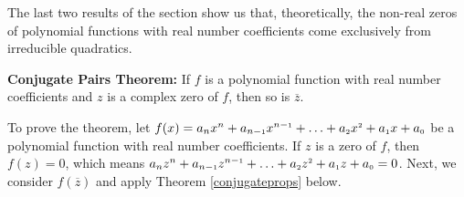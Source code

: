 \documentclass{ximera}
\begin{document}
\smallskip

The last two results of the section show us that, theoretically, the non-real zeros of polynomial functions with real number coefficients come exclusively from irreducible quadratics.

\smallskip

\colorbox{ResultColor}{\bbm

\begin{thm} \label{conjugatepairsthm}\textbf{Conjugate Pairs Theorem:} If $f$ is a polynomial function with real number coefficients and $z$ is a complex zero of $f$, then so is $\overline{z}$. 

\end{thm}

\ebm}

\smallskip

To prove the theorem, let 
$ f(x) = a_{n} x^{n} + a_{n-\mbox{\tiny$1$}} x^{n-\mbox{\tiny$1$}} + \ldots + a_{\mbox{\tiny $2$}} x^{\mbox{\tiny $2$}} + a_{\mbox{\tiny $1$}} x + a_{\mbox{\tiny $0$}}$ be a polynomial function with real number coefficients.  If $z$ is a zero of $f$, then $f(z) = 0$, which means $a_{n} z^{n} + a_{n-\mbox{\tiny$1$}} z^{n-\mbox{\tiny$1$}} + \ldots + a_{\mbox{\tiny $2$}} z^{\mbox{\tiny $2$}} + a_{\mbox{\tiny $1$}} z + a_{\mbox{\tiny $0$}} = 0$.  Next, we consider $f\left(\overline{z}\right)$ and apply Theorem \ref{conjugateprops} below.
\end{document}
